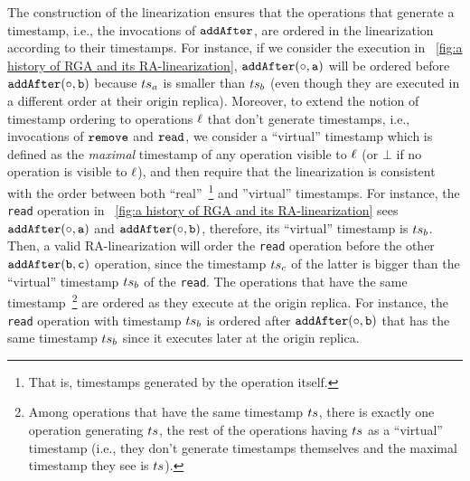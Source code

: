 The construction of the linearization ensures that the operations that generate a timestamp, i.e., the invocations of ${\tt addAfter}$, are ordered in the linearization according to their timestamps. For instance, if we consider the execution in \figureautorefname~\ref{fig:a history of RGA and its RA-linearization}, $\alabelshort[{\tt addAfter}]{\circ,a}$ will be ordered before $\alabelshort[{\tt addAfter}]{\circ,b}$ because $ts_a$ is smaller than $ts_b$ (even though they are executed in a different order at their origin replica). 
%
Moreover, to extend the notion of timestamp ordering to operations $\ell$ that don't generate timestamps, i.e., invocations of ${\tt remove}$ and ${\tt read}$, we consider a ``virtual'' timestamp which is defined as the \emph{maximal} timestamp of any operation visible to $\ell$ (or $\bot$ if no operation is visible to $\ell$), and then require that the linearization is consistent with the order between both ``real''~\footnote{That is, timestamps generated by the operation itself.} and ''virtual'' timestamps. For instance, the {\tt read} operation in \figureautorefname~\ref{fig:a history of RGA and its RA-linearization} sees $\alabelshort[{\tt addAfter}]{\circ,a}$ and $\alabelshort[{\tt addAfter}]{\circ,b}$, therefore, its ``virtual'' timestamp is $ts_b$. Then, a valid RA-linearization will order the {\tt read} operation before the other $\alabelshort[{\tt addAfter}]{b,c}$ operation, since the timestamp $ts_c$ of the latter is bigger than the ``virtual'' timestamp $ts_b$ of the {\tt read}. The operations that have the same timestamp~\footnote{Among operations that have the same timestamp $ts$, there is exactly one operation generating $ts$, the rest of the operations having $ts$ as a ``virtual'' timestamp (i.e., they don't generate timestamps themselves and the maximal timestamp they see is $ts$).} are ordered as they execute at the origin replica. For instance, the {\tt read} operation with timestamp $ts_b$ is ordered after $\alabelshort[{\tt addAfter}]{\circ,b}$ that has the same timestamp $ts_b$ since it executes later at the origin replica.



